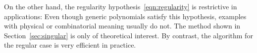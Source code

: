\documentclass{sig-alternate}
\begin{document}
On the other hand, the regularity hypothesis~\eqref{eqn:regularity} is restrictive in applications:
Even though generic polynomials satisfy this hypothesis, examples with physical or combinatorial meaning usually do not.
The method shown in Section~\ref{sec:singular} is only of theoretical interest.
By contrast, the algorithm for the regular case is very efficient in practice.


\scriptsize


\end{document}
